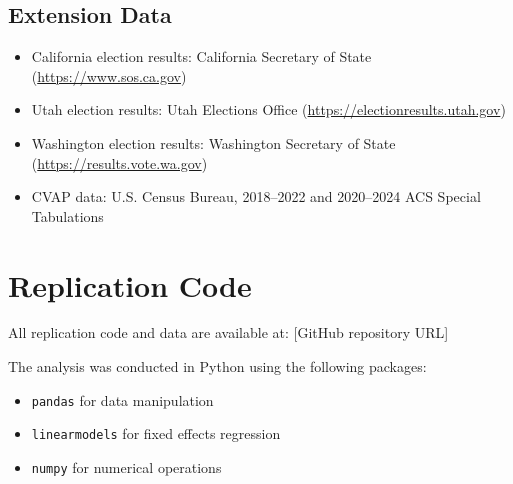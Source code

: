 \documentclass[12pt]{article}
\begin{document}
\subsection{Extension Data}
\begin{itemize}
    \item California election results: California Secretary of State (\url{https://www.sos.ca.gov})
    \item Utah election results: Utah Elections Office (\url{https://electionresults.utah.gov})
    \item Washington election results: Washington Secretary of State (\url{https://results.vote.wa.gov})
    \item CVAP data: U.S. Census Bureau, 2018--2022 and 2020--2024 ACS Special Tabulations
\end{itemize}

\section{Replication Code}

All replication code and data are available at: [GitHub repository URL]

The analysis was conducted in Python using the following packages:
\begin{itemize}
    \item \texttt{pandas} for data manipulation
    \item \texttt{linearmodels} for fixed effects regression
    \item \texttt{numpy} for numerical operations
\end{itemize}
\end{document}
